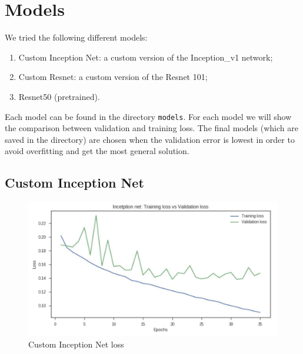 \section{Models}

We tried the following different models:
\begin{enumerate}
	\item Custom Inception Net: a custom version of the Inception\_v1 network;
	\item Custom Resnet: a custom version of the Resnet 101;
	\item Resnet50 (pretrained).
\end{enumerate}

Each model can be found in the directory \texttt{models}.
For each model we will show the comparison between validation and training loss. The final models (which are saved in the directory) are chosen when the validation error is lowest in order to avoid overfitting and get the most general solution.

\subsection{Custom Inception Net}

\begin{figure}[!h]
	\begin{center}
		\includegraphics[width=0.6\linewidth]{images/custom_inception_loss.jpg}
		\caption{Custom Inception Net loss}
		\label{fig:cust-incep-loss}
	\end{center}
\end{figure}


